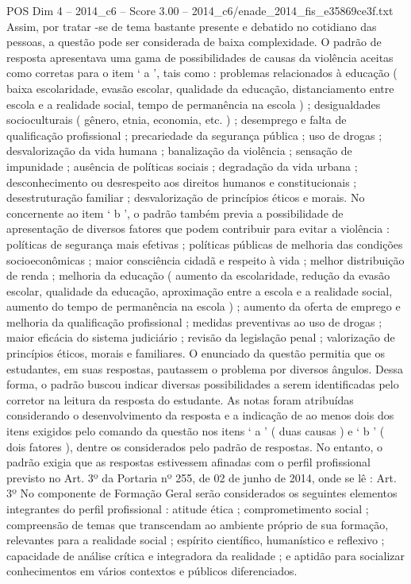 \begin{textsample}{POS Dim 4 – 2014\_c6 – Score 3.00 – 2014\_c6/enade\_2014\_fis\_e35869ce3f.txt}
Assim, por tratar -se de tema bastante presente e debatido no cotidiano das pessoas, a questão pode ser considerada de baixa complexidade.
O padrão de resposta apresentava uma gama de possibilidades de causas da violência aceitas como corretas para o item ‘ a ’, tais como : problemas relacionados à educação ( baixa escolaridade, evasão escolar, qualidade da educação, distanciamento entre escola e a realidade social, tempo de permanência na escola ) ; desigualdades socioculturais ( gênero, etnia, economia, etc. ) ; desemprego e falta de qualificação profissional ; precariedade da segurança pública ; uso de drogas ; desvalorização da vida humana ; banalização da violência ; sensação de impunidade ; ausência de políticas sociais ; degradação da vida urbana ; desconhecimento ou desrespeito aos direitos humanos e constitucionais ; desestruturação familiar ; desvalorização de princípios éticos e morais.
No concernente ao item ‘ b ’, o padrão também previa a possibilidade de apresentação de diversos fatores que podem contribuir para evitar a violência : políticas de segurança mais efetivas ; políticas públicas de melhoria das condições socioeconômicas ; maior consciência cidadã e respeito à vida ; melhor distribuição de renda ; melhoria da educação ( aumento da escolaridade, redução da evasão escolar, qualidade da educação, aproximação entre a escola e a realidade social, aumento do tempo de permanência na escola ) ; aumento da oferta de emprego e melhoria da qualificação profissional ; medidas preventivas ao uso de drogas ; maior eficácia do sistema judiciário ; revisão da legislação penal ; valorização de princípios éticos, morais e familiares.
O enunciado da questão permitia que os estudantes, em suas respostas, pautassem o problema por diversos ângulos.
Dessa forma, o padrão buscou indicar diversas possibilidades a serem identificadas pelo corretor na leitura da resposta do estudante.
As notas foram atribuídas considerando o desenvolvimento da resposta e a indicação de ao menos dois dos itens exigidos pelo comando da questão nos itens ‘ a ’ ( duas causas ) e ‘ b ’ ( dois fatores ), dentre os considerados pelo padrão de respostas.
No entanto, o padrão exigia que as respostas estivessem afinadas com o perfil profissional previsto no Art. 3º da Portaria nº 255, de 02 de junho de 2014, onde se lê : Art. 3º No componente de Formação Geral serão considerados os seguintes elementos integrantes do perfil profissional : atitude ética ; comprometimento social ; compreensão de temas que transcendam ao ambiente próprio de sua formação, relevantes para a realidade social ; espírito científico, humanístico e reflexivo ; capacidade de análise crítica e integradora da realidade ; e aptidão para socializar conhecimentos em vários contextos e públicos diferenciados.

\end{textsample}
